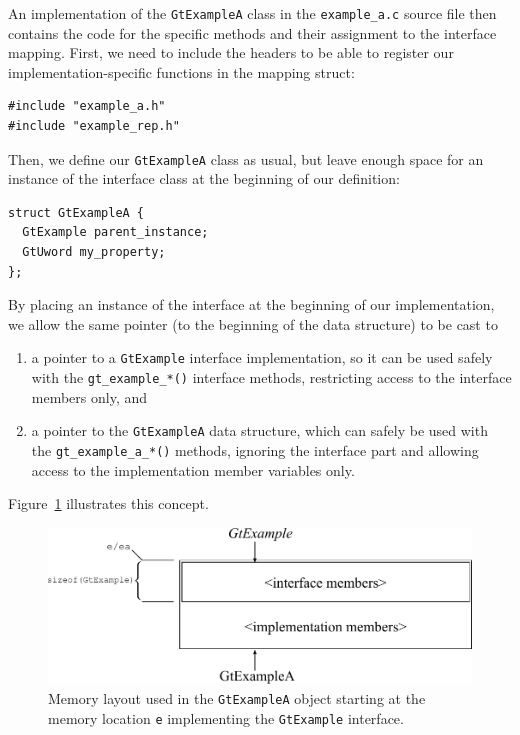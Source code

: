\documentclass[11pt,final]{article}
\newcommand{\keyword}[1]{\lstinline{#1}}
\begin{document}
An implementation of the \keyword{GtExampleA} class in the \keyword{example_a.c}
source file then contains the code for the specific methods and their assignment
to the interface mapping. First, we need to include the headers to be able to
register our implementation-specific functions in the mapping struct:

\begin{lstlisting}
#include "example_a.h"
#include "example_rep.h"
\end{lstlisting}

Then, we define our \keyword{GtExampleA} class as usual, but leave enough space
for an instance of the interface class at the beginning of our definition:

\begin{lstlisting}
struct GtExampleA {
  GtExample parent_instance;
  GtUword my_property;
};
\end{lstlisting}

By placing an instance of the interface at the beginning of our implementation,
we allow the same pointer (to the beginning of the data structure) to be cast to
\begin{enumerate}
\item
a pointer to a \keyword{GtExample} interface implementation, so it can be used
safely with the \keyword{gt_example_*()} interface methods, restricting access
to the interface members only, and
\item
a pointer to the \keyword{GtExampleA} data structure, which can safely be used
with the \keyword{gt_example_a_*()} methods, ignoring the interface part and
allowing access to the implementation member variables only.
\end{enumerate}
Figure~\ref{fig:interfacememlayout} illustrates this concept.

\begin{figure}
\begin{center}
\includegraphics[width=.7\textwidth]{mlayout}
\end{center}
\caption{Memory layout used in the \keyword{GtExampleA} object starting at the
 memory location \keyword{e} implementing the \keyword{GtExample} interface.}
\label{fig:interfacememlayout}
\end{figure}
\end{document}

